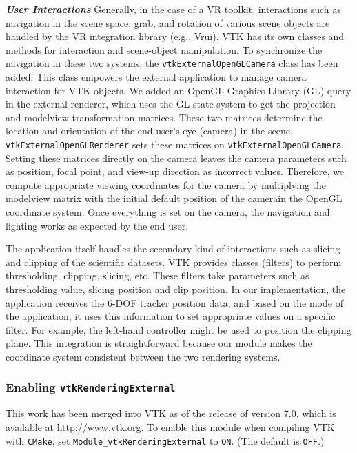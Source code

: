 \textbf{\textit{User Interactions}} Generally, in the case of a VR toolkit, interactions such as navigation in the scene space, grab, and rotation of various scene objects are handled by the VR integration library (e.g., Vrui).
VTK has its own classes and methods for interaction and scene-object manipulation.
To synchronize the navigation in these two systems, the \texttt{vtkExternalOpenGLCamera} class has been added.
This class empowers the external application to manage camera interaction for VTK objects.
We added an OpenGL Graphics Library (GL) query in the external renderer, which uses the GL state system to get the projection and modelview transformation matrices.
These two matrices determine the location and orientation of the end user's eye
(camera) in the scene.
\texttt{vtkExternalOpenGLRenderer} sets these matrices on \texttt{vtkExternalOpenGLCamera}.
Setting these matrices directly on the camera leaves the camera parameters such as position, focal point, and view-up direction as incorrect values. Therefore, we compute appropriate viewing coordinates for the camera by multiplying the modelview matrix with the initial default position of the camerain the OpenGL coordinate system. 
Once everything is set on the camera, the navigation and lighting works as expected by the end user.

The application itself handles the secondary kind of interactions such as slicing and clipping of the scientific datasets.
VTK provides classes (filters) to perform thresholding, clipping, slicing, etc.
These filters take parameters such as thresholding value, slicing position and clip position. 
In our implementation, the application receives the 6-DOF tracker position data, and based on the mode of the application, it uses this information to set appropriate values on a specific filter.
For example, the left-hand controller might be used to position the clipping plane.
This integration is straightforward because our module makes the coordinate system consistent between the two rendering systems.

\subsubsection{Enabling \texttt{vtkRenderingExternal}}

This work has been merged into VTK as of the release of version 7.0, which is available at
\url{http://www.vtk.org}.
To enable this module when compiling VTK with \texttt{CMake},
set \texttt{Module\_vtkRenderingExternal} to \texttt{ON}. (The default is \texttt{OFF}.)

